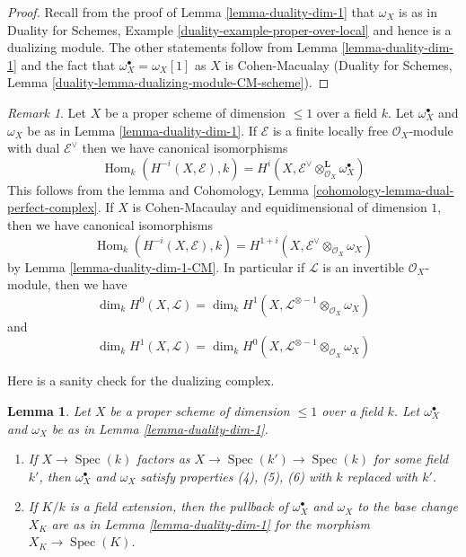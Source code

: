 \documentclass{stacks-project}
\theoremstyle{plain}
\newtheorem{lemma}[subsection]{Lemma}
\theoremstyle{definition}
\theoremstyle{remark}
\newtheorem{remark}[subsection]{Remark}
\numberwithin{equation}{subsection}
\def\Spec{\mathop{\mathrm{Spec}}}
\def\Hom{\mathop{\mathrm{Hom}}\nolimits}
\begin{document}
\begin{proof}
Recall from the proof of Lemma \ref{lemma-duality-dim-1}
that $\omega_X$ is as in Duality for Schemes, Example
\ref{duality-example-proper-over-local} and hence is
a dualizing module. The other statements follow from
Lemma \ref{lemma-duality-dim-1}
and the fact that $\omega_X^\bullet = \omega_X[1]$
as $X$ is Cohen-Macualay (Duality for Schemes, Lemma
\ref{duality-lemma-dualizing-module-CM-scheme}).
\end{proof}

\begin{remark}
\label{remark-rework-duality-locally-free}
Let $X$ be a proper scheme of dimension $\leq 1$ over a field $k$.
Let $\omega_X^\bullet$ and $\omega_X$ be as in Lemma \ref{lemma-duality-dim-1}.
If $\mathcal{E}$ is a finite locally free $\mathcal{O}_X$-module
with dual $\mathcal{E}^\vee$ then we have canonical isomorphisms
$$
\Hom_k(H^{-i}(X, \mathcal{E}), k) =
H^i(X, \mathcal{E}^\vee \otimes_{\mathcal{O}_X}^\mathbf{L} \omega_X^\bullet)
$$
This follows from the lemma and
Cohomology, Lemma \ref{cohomology-lemma-dual-perfect-complex}.
If $X$ is Cohen-Macaulay and equidimensional of dimension $1$, then
we have canonical isomorphisms
$$
\Hom_k(H^{-i}(X, \mathcal{E}), k) =
H^{1 + i}(X, \mathcal{E}^\vee \otimes_{\mathcal{O}_X} \omega_X)
$$
by Lemma \ref{lemma-duality-dim-1-CM}. In particular
if $\mathcal{L}$ is an invertible $\mathcal{O}_X$-module, then we have
$$
\dim_k H^0(X, \mathcal{L}) =
\dim_k H^1(X, \mathcal{L}^{\otimes -1} \otimes_{\mathcal{O}_X} \omega_X)
$$
and
$$
\dim_k H^1(X, \mathcal{L}) =
\dim_k H^0(X, \mathcal{L}^{\otimes -1} \otimes_{\mathcal{O}_X} \omega_X)
$$
\end{remark}

\noindent
Here is a sanity check for the dualizing complex.

\begin{lemma}
\label{lemma-sanity-check-duality}
Let $X$ be a proper scheme of dimension $\leq 1$ over a field $k$.
Let $\omega_X^\bullet$ and $\omega_X$ be as in Lemma \ref{lemma-duality-dim-1}.
\begin{enumerate}
\item If $X \to \Spec(k)$ factors as $X \to \Spec(k') \to \Spec(k)$
for some field $k'$, then $\omega_X^\bullet$ and $\omega_X$
satisfy properties (4), (5), (6) with $k$ replaced with $k'$.
\item If $K/k$ is a field extension, then the pullback of
$\omega_X^\bullet$ and $\omega_X$ to the base change $X_K$
are as in  Lemma \ref{lemma-duality-dim-1} for the morphism
$X_K \to \Spec(K)$.
\end{enumerate}
\end{lemma}
\end{document}
